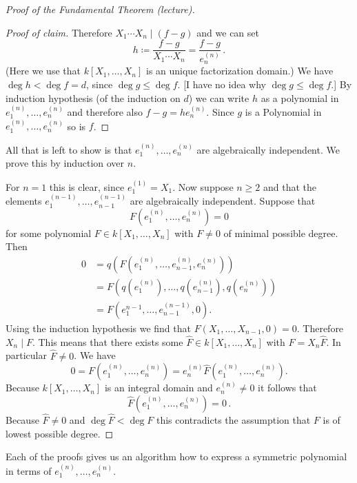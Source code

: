 \begin{proof}[Proof of the Fundamental Theorem (lecture)]
\begin{proof}[Proof of claim]
    Therefore $X_1 \dotsm X_n \mid (f-g)$ and we can set
    \[
                h
      \coloneqq \frac{f-g}{X_1 \dotsm X_n}
      =         \frac{f-g}{e^{(n)}_n} \,.
    \]
    (Here we use that $k[X_1, \dotsc, X_n]$ is an unique factorization domain.)
    We have $\deg h < \deg f = d$, since $\deg g \leq \deg f$.
    [I have no idea why $\deg g \leq \deg f$.]
    By induction hypothesis (of the induction on $d$) we can write $h$ as a polynomial in $e^{(n)}_1, \dotsc, e^{(n)}_n$ and therefore also $f-g = h e^{(n)}_n$.
    Since $g$ is a Polynomial in $e^{(n)}_1, \dotsc, e^{(n)}_n$ so is $f$.
  \end{proof}
  All that is left to show is that $e^{(n)}_1, \dotsc, e^{(n)}_n$ are algebraically independent.
  We prove this by induction over $n$.
  
  For $n = 1$ this is clear, since $e^{(1)}_1 = X_1$.
  Now suppose $n \geq 2$ and that the elements $e^{(n-1)}_1, \dotsc, e^{(n-1)}_{n-1}$ are algebraically independent.
  Suppose that
  \[
      F\left(e^{(n)}_1, \dotsc, e^{(n)}_n\right)
    = 0
  \]
  for some polynomial $F \in k[X_1, \dotsc, X_n]$ with $F \neq 0$ of minimal possible degree.
  Then
  \begin{align*}
        0
    &=  q \left( F \left( e^{(n)}_1, \dotsc, e^{(n)}_{n-1}, e^{(n)}_n \right) \right) \\
    &=  F \left(
            q \left( e^{(n)}_1 \right), \dotsc, q \left( e^{(n)}_{n-1} \right), q \left( e^{(n)}_n \right)
          \right) \\
    &=  F \left( e^{n-1}_1, \dotsc, e^{(n-1)}_{n-1}, 0 \right).
  \end{align*}
  Using the induction hypothesis we find that $F(X_1, \dotsc, X_{n-1}, 0) = 0$.
  Therefore $X_n \mid F$.
  This means that there exists some $\hat{F} \in k[X_1, \dotsc, X_n]$ with $F = X_n \hat{F}$.
  In particular $\hat{F} \neq 0$.
  We have
  \[
      0
    = F\left( e^{(n)}_1, \dotsc, e^{(n)}_n \right)
    = e^{(n)}_n \hat{F}\left( e^{(n)}_1, \dotsc, e^{(n)}_n \right).
  \]
  Because $k[X_1, \dotsc, X_n]$ is an integral domain and $e^{(n)}_n \neq 0$ it follows that
  \[
      \hat{F}\left( e^{(n)}_1, \dotsc, e^{(n)}_n \right)
    = 0 \,.
  \]
  Because $\hat{F} \neq 0$ and $\deg \hat{F} < \deg F$ this contradicts the assumption that $F$ is of lowest possible degree.
\end{proof}


\begin{rem}
  Each of the proofs gives us an algorithm how to express a symmetric polynomial in terms of $e^{(n)}_1, \dotsc, e^{(n)}_n$.
\end{rem}


